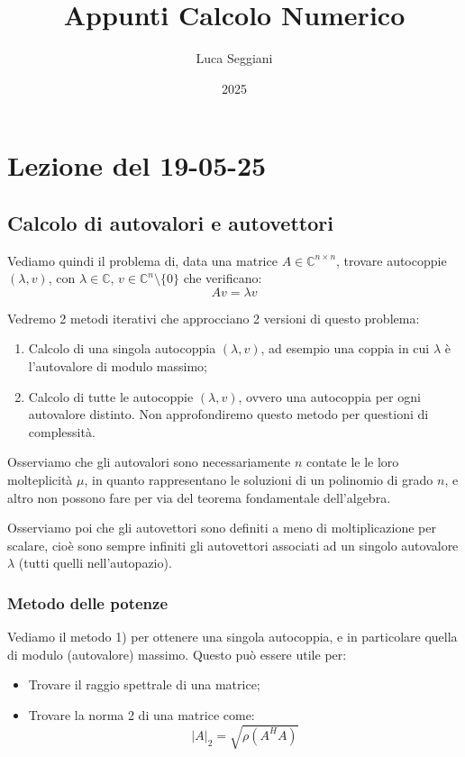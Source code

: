 \documentclass[a4paper,11pt]{article}
\title{Appunti Calcolo Numerico}
\author{Luca Seggiani}
\date{2025}
\begin{document}
\section{Lezione del 19-05-25}

\thispagestyle{empty}
\pagestyle{fancy}

\subsection{Calcolo di autovalori e autovettori}
Vediamo quindi il problema di, data una matrice $A \in \mathbb{C}^{n \times n}$, trovare autocoppie $(\lambda, v)$, con $\lambda \in \mathbb{C}$, $v \in \mathbb{C}^n \setminus \{0\}$ che verificano:
$$
A v = \lambda v
$$

Vedremo 2 metodi iterativi che approcciano 2 versioni di questo problema:
\begin{enumerate}
	\item Calcolo di una singola autocoppia $(\lambda, v)$, ad esempio una coppia in cui $\lambda$ è l'autovalore di modulo massimo;
	\item Calcolo di tutte le autocoppie $(\lambda, v)$, ovvero una autocoppia per ogni autovalore distinto. Non approfondiremo questo metodo per questioni di complessità.
\end{enumerate}

Osserviamo che gli autovalori sono necessariamente $n$ contate le le loro molteplicità $\mu$, in quanto rappresentano le soluzioni di un polinomio di grado $n$, e altro non possono fare per via del teorema fondamentale dell'algebra.

Osserviamo poi che gli autovettori sono definiti a meno di moltiplicazione per scalare, cioè sono sempre infiniti gli autovettori associati ad un singolo autovalore $\lambda$ (tutti quelli nell'autopazio).

\subsubsection{Metodo delle potenze}
Vediamo il metodo 1) per ottenere una singola autocoppia, e in particolare quella di modulo (autovalore) massimo.
Questo può essere utile per:
\begin{itemize}
	\item Trovare il raggio spettrale di una matrice;
	\item Trovare la norma 2 di una matrice come:
		$$
			|A|_2 = \sqrt{\rho(A^H A)}
		$$
\end{itemize}
\end{document}
